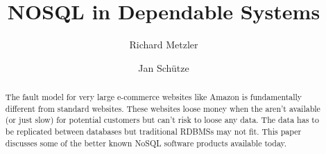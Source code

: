 \documentclass{llncs}
\begin{document}
%
\frontmatter          %
%
\pagestyle{headings}  %
%
\mainmatter              %
%
\title{NOSQL in Dependable Systems}
%
%
\author{Richard Metzler \and Jan Sch\"utze}
%
%
%

\maketitle              %

\begin{abstract}
The fault model for very large e-commerce websites like Amazon is fundamentally
different from standard websites. These websites loose money when the aren't
available (or just slow) for potential customers but can't risk to loose any
data. The data has to be replicated between databases but traditional RDBMSs
may not fit. This paper discusses some of the better known NoSQL software
products available today.
\end{abstract}
\end{document}
